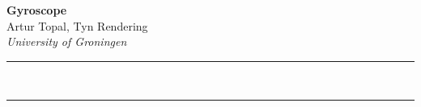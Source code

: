 \documentclass[a4paper,9pt]{article}
\renewenvironment{abstract}
 {\par\noindent\textbf{\abstractname}\ \ignorespaces \\}
 {\par\noindent\medskip}
\begin{document}
\pagestyle{fancy}
\thispagestyle{empty}
\fancyhead[L]{}

\renewcommand*{\thefootnote}{\fnsymbol{footnote}}

\begin{center}
\Large{\textbf{Gyroscope}}
\vspace{0.4cm}
\normalsize
\\ Artur Topal, Tyn Rendering \\
\vspace{0.1cm}
\textit{University of Groningen}
\medskip
\normalsize
\end{center}

{\color{gray}\hrule}
\vspace{0.4cm}

\begin{abstract}

\end{abstract}

{\color{gray}\hrule}
\medskip







\appendix



\printbibliography
\end{document}
